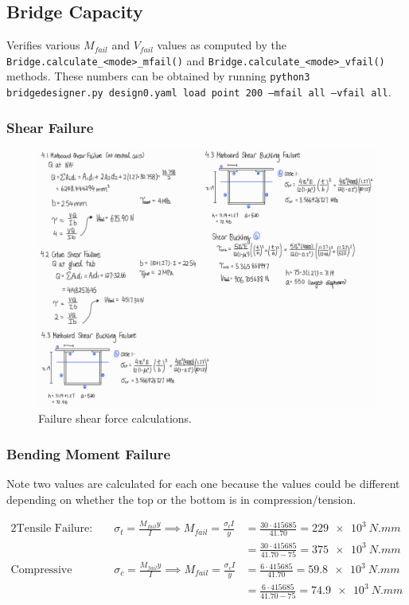 \documentclass{article}
\begin{document}
\subsection{Bridge Capacity}

Verifies various \(M_{fail}\) and \(V_{fail}\) values as computed by the \texttt{Bridge.calculate_<mode>_mfail()}
and \texttt{Bridge.calculate_<mode>_vfail()} methods. These numbers can be obtained by running
\texttt{python3 bridgedesigner.py design0.yaml load point 200 --mfail all --vfail all}.

\subsubsection{Shear Failure}

\begin{figure}[H]
    \centering
    \includegraphics[width=\textwidth]{shear.png}
    \caption{Failure shear force calculations.}
\end{figure}

\subsubsection{Bending Moment Failure}

Note two values are calculated for each one because the values could be different depending on whether the top or the
bottom is in compression/tension.

\begin{alignat*}{2}
    \text{Tensile Failure: }&\sigma_t = \frac{M_{fail}y}{I} \implies M_{fail} = \frac{\sigma_t I}{y} &= \frac{30 \cdot 415685}{41.70} = \SI{229e3}{N.mm} \\
        & &= \frac{30 \cdot 415685}{41.70 - 75} = \SI{375e3}{N.mm} \\
    \text{Compressive Failure: }&\sigma_c = \frac{M_{fail}y}{I} \implies M_{fail} = \frac{\sigma_c I}{y} &= \frac{6 \cdot 415685}{41.70} = \SI{59.8e3}{N.mm} \\
        & &= \frac{6 \cdot 415685}{41.70 - 75} = \SI{74.9e3}{N.mm} \\
\end{alignat*}
\end{document}
